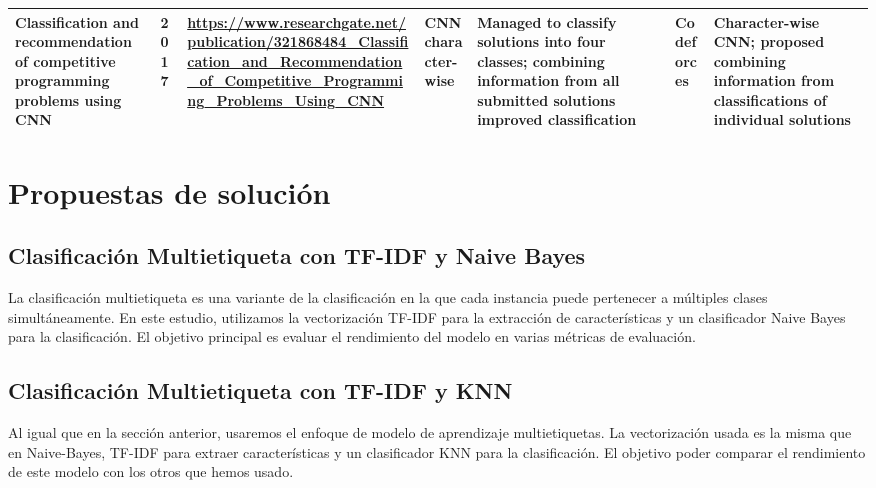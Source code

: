 \documentclass{article}
\begin{document}
\begin{itemize}
\begin{longtable}{|p{2cm}|p{0.8cm}|p{2cm}|p{2cm}|p{3cm}|p{2cm}|p{3cm}|}
              \hline
              Classification and recommendation of competitive programming problems
              using CNN
                             & 2017
                             & \href{https://www.researchgate.net/publication/321868484_Classification_and_Recommendation_of_Competitive_Programming_Problems_Using_CNN}{\url{https://www.researchgate.net/publication/321868484_Classification_and_Recommendation_of_Competitive_Programming_Problems_Using_CNN}}

              
              
              
              
              
                             & CNN character-wise 
                             & Managed to classify solutions into four classes; combining information from all submitted solutions improved classification 
                             & Codeforces 
                             & Character-wise CNN; proposed combining information from classifications of individual solutions                                                                                                                                                                                                                                                                                                        \\
              
              \hline
              
          \end{longtable}
          
          
\end{itemize}

\section{Propuestas de solución}
\subsection{Clasificación Multietiqueta con TF-IDF y Naive Bayes}
La clasificación multietiqueta es una variante de la clasificación en la que cada instancia puede pertenecer a múltiples clases simultáneamente. En este estudio, utilizamos la vectorización TF-IDF para la extracción de características y un clasificador Naive Bayes para la clasificación. El objetivo principal es evaluar el rendimiento del modelo en varias métricas de evaluación.
\subsection{Clasificación Multietiqueta con TF-IDF y KNN}
Al igual que en la sección anterior, usaremos el enfoque de modelo de aprendizaje multietiquetas. La vectorización usada es la misma que en Naive-Bayes, TF-IDF para extraer características y un clasificador KNN para la clasificación. El objetivo poder comparar el rendimiento de este modelo con los otros que hemos usado.
\end{document}
